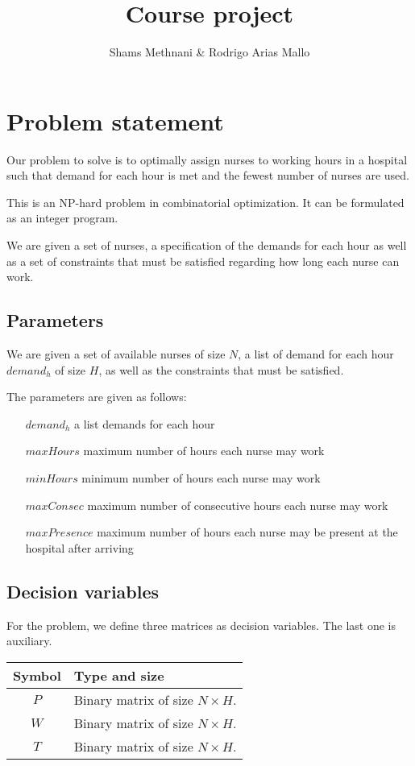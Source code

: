\documentclass[12pt,a4paper]{article}
\title{Course project}
\author{Shams Methnani \& Rodrigo Arias Mallo}
\begin{document}
\maketitle

\section{Problem statement}


Our problem to solve is to optimally assign nurses to working hours in a hospital such that demand for each hour is met and the fewest number of nurses are used.

This is an NP-hard problem in combinatorial optimization. It can be formulated as an integer program.

We are given a set of nurses, a specification of the demands for each hour as well as a set of constraints that must be satisfied regarding how long each nurse can work.

\subsection{Parameters}

We are given a set of available nurses of size $N$, a list of demand for each hour ${demand}_h$ of size $H$, as well as the constraints that must be satisfied.

The parameters are given as follows:
    \begin{enumerate}
    \paragraph{}
        \item [${demand}_h$] a list demands for each hour
        \item [${maxHours}$] maximum number of hours each nurse may work
        \item [${minHours}$] minimum number of hours each nurse may work
        \item [${maxConsec}$] maximum number of consecutive hours each nurse may work
        \item [${maxPresence}$] maximum number of hours each nurse may be present at the hospital after arriving
    \end{enumerate}
%
\subsection{Decision variables}

For the problem, we define three matrices as decision variables. The last one is
auxiliary.
%
\begin{table}[h]
\centering
\begin{tabular}{c l}
\toprule
Symbol & Type and size \\
\midrule
$P$ & Binary matrix of size $N \times H$.\\
$W$ & Binary matrix of size $N \times H$.\\
$T$ & Binary matrix of size $N \times H$.\\
\bottomrule
\end{tabular}
\end{table}
\end{document}
